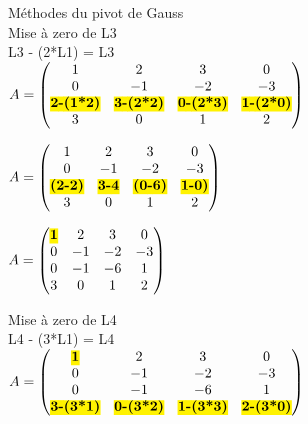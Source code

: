 \vspace{10mm} %
Méthodes du pivot de Gauss \\

\vspace{5mm} %
Mise à zero de L3 \\
L3 - (2*L1) = L3 \\

$
A =
\begin{pmatrix}
  1 & 2 & 3 & 0 \\
  0 & -1 & -2 & -3 \\
  \hl{\textbf{2-(1*2)}} & \hl{\textbf{3-(2*2)}} & \hl{\textbf{0-(2*3)}} & \hl{\textbf{1-(2*0)}} \\
  3 & 0 & 1 & 2 \\
\end{pmatrix}
$

\vspace{5mm} %

$
A =
\begin{pmatrix}
  1 & 2 & 3 & 0 \\
  0 & -1 & -2 & -3 \\
  \hl{\textbf{(2-2)}} & \hl{\textbf{3-4}} & \hl{\textbf{(0-6)}} & \hl{\textbf{1-0)}} \\
  3 & 0 & 1 & 2 \\
\end{pmatrix}
$

\vspace{5mm} %

$
A =
\begin{pmatrix}
  \hl{\textbf{1}} & 2 & 3 & 0 \\
  0 & -1 & -2 & -3 \\
  0 & -1 & -6 & 1 \\
  3 & 0 & 1 & 2 \\
\end{pmatrix}
$

\vspace{10mm} %

Mise à zero de L4 \\
L4 - (3*L1) = L4 \\

$
A =
\begin{pmatrix}
  \hl{\textbf{1}} & 2 & 3 & 0 \\
  0 & -1 & -2 & -3 \\
  0 & -1 & -6 & 1 \\
  \hl{\textbf{3-(3*1)}} & \hl{\textbf{0-(3*2)}} & \hl{\textbf{1-(3*3)}} & \hl{\textbf{2-(3*0)}} \\
\end{pmatrix}
$

